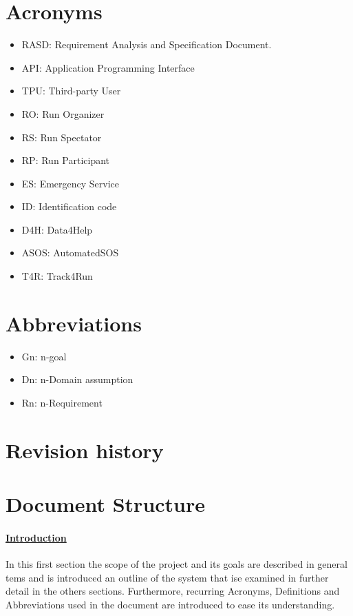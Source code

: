 \section{Acronyms}
\begin{itemize}
\item RASD: Requirement Analysis and Specification Document. 
\item API: Application Programming Interface
\item TPU: Third-party User
\item RO: Run Organizer 
\item	RS: Run Spectator 
\item	RP: Run Participant 
\item	ES: Emergency Service 
\item	ID: Identification code
\item	D4H: Data4Help
\item	ASOS: AutomatedSOS
\item	T4R: Track4Run
\end{itemize}

\section{Abbreviations}
\begin{itemize}
\item Gn: n-goal
\item Dn: n-Domain assumption
\item Rn: n-Requirement
\end{itemize}

\section{Revision history}
\section{Document Structure}
\paragraph{\hyperref[sect:introduction]{Introduction}} In this first section the scope of the project and its goals are described in general tems and is introduced an outline of the system that ise examined in further detail in the others sections. Furthermore, recurring Acronyms, Definitions and Abbreviations used in the document are introduced to ease its understanding.
